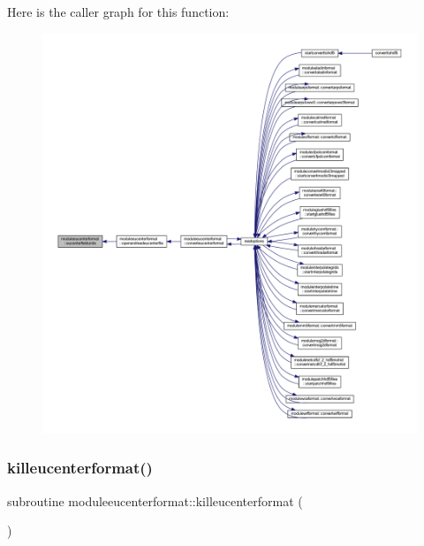 Here is the caller graph for this function\+:\nopagebreak
\begin{figure}[H]
\begin{center}
\leavevmode
\includegraphics[width=350pt]{namespacemoduleeucenterformat_a96acc03f8210b20aa7bb87e45e512333_icgraph}
\end{center}
\end{figure}
\mbox{\label{namespacemoduleeucenterformat_a86566f77f24a79f436c69106f22fe5f7}} 
\subsubsection{\texorpdfstring{killeucenterformat()}{killeucenterformat()}}
{\footnotesize\ttfamily subroutine moduleeucenterformat\+::killeucenterformat (\begin{DoxyParamCaption}{ }\end{DoxyParamCaption})\hspace{0.3cm}{\ttfamily [private]}}

